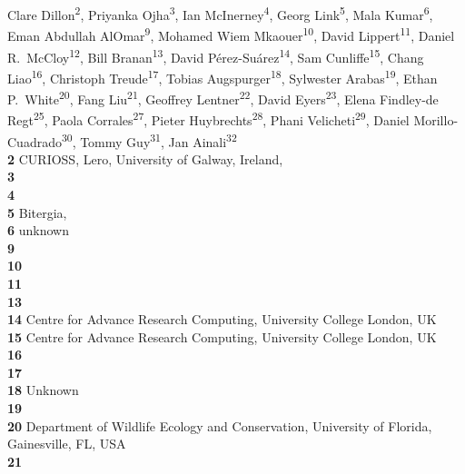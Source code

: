 Clare Dillon\textsuperscript{2},
Priyanka Ojha\textsuperscript{3},
Ian McInerney\textsuperscript{4},
Georg Link\textsuperscript{5},
Mala Kumar\textsuperscript{6},
Eman Abdullah AlOmar\textsuperscript{9},
Mohamed Wiem Mkaouer\textsuperscript{10},
David Lippert\textsuperscript{11},
Daniel R.\ McCloy\textsuperscript{12},
Bill Branan\textsuperscript{13},
David Pérez-Suárez\textsuperscript{14},
Sam Cunliffe\textsuperscript{15},
Chang Liao\textsuperscript{16},
Christoph Treude\textsuperscript{17},
Tobias Augspurger\textsuperscript{18},
Sylwester Arabas\textsuperscript{19},
Ethan P.\ White\textsuperscript{20},
Fang Liu\textsuperscript{21},
Geoffrey Lentner\textsuperscript{22},
David Eyers\textsuperscript{23},
Elena Findley-de Regt\textsuperscript{25},
Paola Corrales\textsuperscript{27},
Pieter Huybrechts\textsuperscript{28},
Phani Velicheti\textsuperscript{29},
Daniel Morillo-Cuadrado\textsuperscript{30},
Tommy Guy\textsuperscript{31},
Jan Ainali\textsuperscript{32}
\\
\bigskip
\textbf{2} CURIOSS, Lero, University of Galway, Ireland, \\
\textbf{3} \\
\textbf{4} \\
\textbf{5} Bitergia, \\
\textbf{6} unknown\\
\textbf{9} \\
\textbf{10} \\
\textbf{11} \\
\textbf{13} \\
\textbf{14} Centre for Advance Research Computing, University College London, UK \\
\textbf{15} Centre for Advance Research Computing, University College London, UK \\
\textbf{16} \\
\textbf{17} \\
\textbf{18} Unknown\\
\textbf{19} \\
\textbf{20} Department of Wildlife Ecology and Conservation, University of Florida, Gainesville, FL, USA \\
\textbf{21} \\
